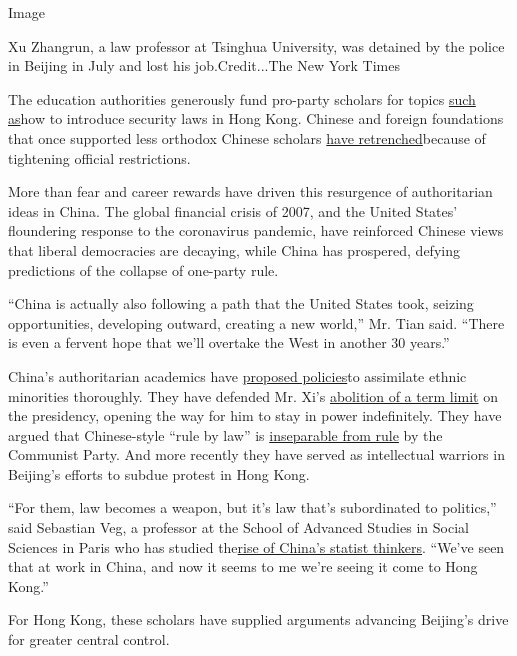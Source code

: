 Image

Xu Zhangrun, a law professor at Tsinghua University, was detained by the
police in Beijing in July and lost his job.Credit...The New York Times

The education authorities generously fund pro-party scholars for topics
\href{http://news.sohu.com/20150720/n417161554.shtml}{such as}how to
introduce security laws in Hong Kong. Chinese and foreign foundations
that once supported less orthodox Chinese scholars
\href{https://www.nytimes.com/2016/12/29/world/asia/china-foreign-ngo.html}{have
retrenched}because of tightening official restrictions.

More than fear and career rewards have driven this resurgence of
authoritarian ideas in China. The global financial crisis of 2007, and
the United States' floundering response to the coronavirus pandemic,
have reinforced Chinese views that liberal democracies are decaying,
while China has prospered, defying predictions of the collapse of
one-party rule.

``China is actually also following a path that the United States took,
seizing opportunities, developing outward, creating a new world,'' Mr.
Tian said. ``There is even a fervent hope that we'll overtake the West
in another 30 years.''

China's authoritarian academics have
\href{https://jamestown.org/program/toward-a-second-generation-of-ethnic-policies/}{proposed
policies}to assimilate ethnic minorities thoroughly. They have defended
Mr. Xi's
\href{https://www.nytimes.com/2018/03/11/world/asia/china-xi-constitution-term-limits.html}{abolition
of a term limit} on the presidency, opening the way for him to stay in
power indefinitely. They have argued that Chinese-style ``rule by law''
is \href{http://www.aisixiang.com/data/77230.html}{inseparable from
rule} by the Communist Party. And more recently they have served as
intellectual warriors in Beijing's efforts to subdue protest in Hong
Kong.

``For them, law becomes a weapon, but it's law that's subordinated to
politics,'' said Sebastian Veg, a professor at the School of Advanced
Studies in Social Sciences in Paris who has studied
the\href{https://www.journals.uchicago.edu/doi/abs/10.1086/702687}{rise
of China's statist thinkers}. ``We've seen that at work in China, and
now it seems to me we're seeing it come to Hong Kong.''

For Hong Kong, these scholars have supplied arguments advancing
Beijing's drive for greater central control.

